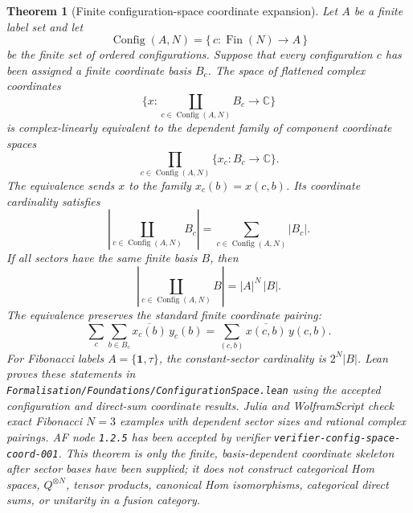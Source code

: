 \documentclass[11pt]{article}
\newtheorem{theorem}[definition]{Theorem}
\begin{document}
\begin{theorem}[Finite configuration-space coordinate expansion]
Let \(A\) be a finite label set and let
\[
\operatorname{Config}(A,N)=\{\,c:\operatorname{Fin}(N)\to A\,\}
\]
be the finite set of ordered configurations. Suppose that every
configuration \(c\) has been assigned a finite coordinate basis \(B_c\). The
space of flattened complex coordinates
\[
\{x:\coprod_{c\in\operatorname{Config}(A,N)}B_c\to\mathbb C\}
\]
is complex-linearly equivalent to the dependent family of component
coordinate spaces
\[
\prod_{c\in\operatorname{Config}(A,N)}\{x_c:B_c\to\mathbb C\}.
\]
The equivalence sends \(x\) to the family \(x_c(b)=x(c,b)\). Its coordinate
cardinality satisfies
\[
\left|\coprod_{c\in\operatorname{Config}(A,N)}B_c\right|
=\sum_{c\in\operatorname{Config}(A,N)}|B_c|.
\]
If all sectors have the same finite basis \(B\), then
\[
\left|\coprod_{c\in\operatorname{Config}(A,N)}B\right|
=|A|^N\,|B|.
\]
The equivalence preserves the standard finite coordinate pairing:
\[
\sum_c\sum_{b\in B_c}\overline{x_c(b)}\,y_c(b)
=
\sum_{(c,b)}\overline{x(c,b)}\,y(c,b).
\]
For Fibonacci labels \(A=\{\mathbf 1,\tau\}\), the constant-sector
cardinality is \(2^N|B|\). Lean proves these statements in
\texttt{Formalisation/Foundations/ConfigurationSpace.lean} using the accepted
configuration and direct-sum coordinate results. Julia and WolframScript
check exact Fibonacci \(N=3\) examples with dependent sector sizes and
rational complex pairings. AF node \texttt{1.2.5} has been accepted by
verifier \texttt{verifier-config-space-coord-001}. This theorem is only the
finite, basis-dependent coordinate skeleton after sector bases have been
supplied; it does not construct categorical Hom spaces, \(Q^{\otimes N}\),
tensor products, canonical Hom isomorphisms, categorical direct sums, or
unitarity in a fusion category.
\end{theorem}
\end{document}
